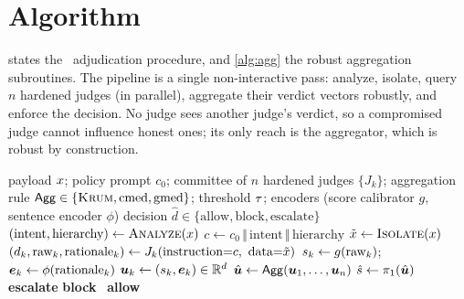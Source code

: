 \section{Algorithm}
\label{sec:algorithm}

 states the \Aegis\ adjudication procedure, and \cref{alg:agg} the robust
aggregation subroutines. The pipeline is a single non-interactive pass: analyze, isolate,
query $n$ hardened judges (in parallel), aggregate their verdict vectors robustly, and
enforce the decision. No judge sees another judge's verdict, so a compromised judge cannot
influence honest ones; its only reach is the aggregator, which is robust by construction.

\begin{algorithm}[t]
\caption{\Aegis\ adjudication}
\label{alg:aegis}
\begin{algorithmic}[1]
\Require payload $x$; policy prompt $c_0$; committee of $n$ hardened judges
  $\{J_k\}$; aggregation rule $\mathsf{Agg}\in\{\textsc{Krum},\operatorname{cmed},\operatorname{gmed}\}$; threshold $\tau$;
  encoders (score calibrator $g$, sentence encoder $\phi$)
\Ensure decision $\hat d\in\{\text{allow},\text{block},\text{escalate}\}$
\State $(\text{intent},\text{hierarchy}) \gets \textsc{Analyze}(x)$
\State $c \gets c_0 \,\Vert\, \text{intent}\,\Vert\,\text{hierarchy}$
\State $\tilde{x} \gets \textsc{Isolate}(x)$
  \State $(d_k, \text{raw}_k, \text{rationale}_k) \gets J_k(\text{instruction}{=}c,\ \text{data}{=}\tilde{\pay})$
  \State $s_k \gets g(\text{raw}_k)$; \quad $\bm{e}_k \gets \phi(\text{rationale}_k)$
  \State $\bm{u}_k \gets (s_k, \bm{e}_k)\in\mathbb{R}^{d}$
\EndFor
\State $\hat{\bm{u}} \gets \mathsf{Agg}(\bm{u}_1,\dots,\bm{u}_n)$
\State $\hat s \gets \pi_1(\hat{\bm{u}})$
 \Return \textbf{escalate}
 \Return \textbf{block}
\Else{} \ \Return \textbf{allow}
\EndIf
\end{algorithmic}
\end{algorithm}

